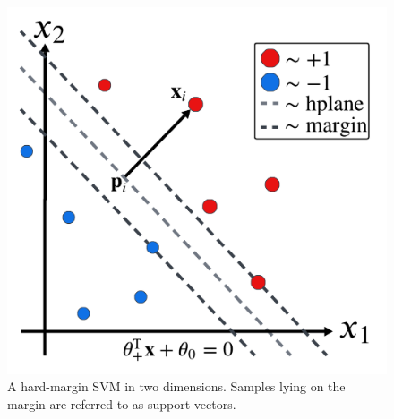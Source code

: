 \documentclass[11pt]{article}
\begin{document}
\begin{figure}[t]
    \centering
    \begin{minipage}{0.54\linewidth}
        \includegraphics[width=\linewidth]{./figures/supervised_learning/SVM_hard_margin.pdf}
    \end{minipage}%
    \hfill
    \begin{minipage}{0.46\linewidth}
        \caption{A hard-margin SVM in two dimensions. Samples lying on the margin are referred to as support vectors.}
        \label{fig:SVM_hard_margin}
    \end{minipage}
\end{figure}
\end{document}
